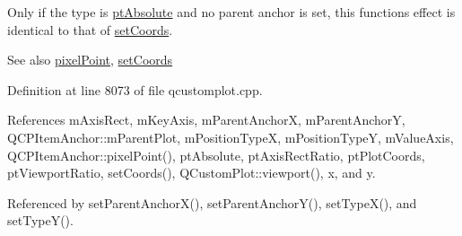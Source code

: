 Only if the type is \hyperlink{class_q_c_p_item_position_aad9936c22bf43e3d358552f6e86dbdc8a564f5e53e550ead1ec5fc7fc7d0b73e0}{pt\+Absolute} and no parent anchor is set, this function\textquotesingle{}s effect is identical to that of \hyperlink{class_q_c_p_item_position_aa988ba4e87ab684c9021017dcaba945f}{set\+Coords}.

\begin{DoxySeeAlso}{See also}
\hyperlink{class_q_c_p_item_position_ae490f9c76ee2ba33752c495d3b6e8fb5}{pixel\+Point}, \hyperlink{class_q_c_p_item_position_aa988ba4e87ab684c9021017dcaba945f}{set\+Coords} 
\end{DoxySeeAlso}


Definition at line 8073 of file qcustomplot.\+cpp.



References m\+Axis\+Rect, m\+Key\+Axis, m\+Parent\+Anchor\+X, m\+Parent\+Anchor\+Y, Q\+C\+P\+Item\+Anchor\+::m\+Parent\+Plot, m\+Position\+Type\+X, m\+Position\+Type\+Y, m\+Value\+Axis, Q\+C\+P\+Item\+Anchor\+::pixel\+Point(), pt\+Absolute, pt\+Axis\+Rect\+Ratio, pt\+Plot\+Coords, pt\+Viewport\+Ratio, set\+Coords(), Q\+Custom\+Plot\+::viewport(), x, and y.



Referenced by set\+Parent\+Anchor\+X(), set\+Parent\+Anchor\+Y(), set\+Type\+X(), and set\+Type\+Y().


